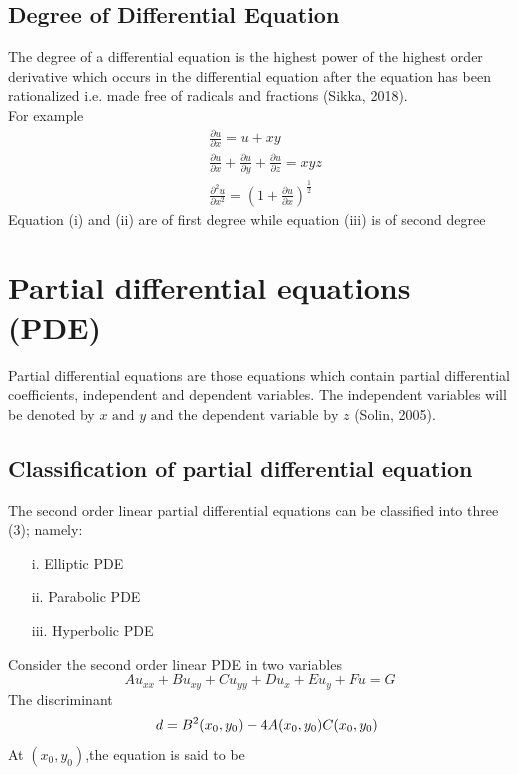 \documentclass[12pt]{report}
\begin{document}
\subsection{Degree of Differential Equation}
\qquad The degree of a differential equation is the highest power of  the highest order derivative which occurs in the differential equation after the equation has been rationalized i.e. made free of radicals and fractions (Sikka, 2018).\\
For example
\begin{align*}
& \frac{\partial u}{\partial x}=u+xy\tag{i}\\
& \frac{\partial u}{\partial x}+ \frac{\partial u}{\partial y}+\frac{\partial u}{\partial z}=xyz\tag{ii}\\
& \frac{\partial^2u}{\partial x^2}=\left(1+\frac{\partial u}{\partial x}\right)^{\frac{1}{2}}\tag{iii}
\end{align*}
Equation (i) and (ii) are of first degree while equation (iii) is of second degree
\section{Partial differential equations (PDE)}
Partial differential equations are those equations which contain partial differential coefficients, independent and dependent variables. The independent variables will be denoted by $x \mbox{ and } y \mbox{ and the dependent variable by } z$ (Solin, 2005).\\
\subsection {Classification of partial differential equation}
\par The second order linear partial differential equations can be classified into three (3); namely:
\begin{enumerate}
	\item[i.] Elliptic PDE 
	\item[ii.] Parabolic PDE 
	\item[iii.] Hyperbolic PDE 
\end{enumerate}

\par Consider the second order linear PDE in two variables
\begin{equation}
Au_{xx} + Bu_{xy} +Cu_{yy} +Du_x+ Eu_y+ Fu=G
\end{equation}
The discriminant\\
\begin{equation*}
\quad d=B^2(x_0,y_0) - 4A(x_0,y_0)C(x_0,y_0)\\
\end{equation*}
At $(x_0, y_0)$,the equation is said to be \\
\end{document}
